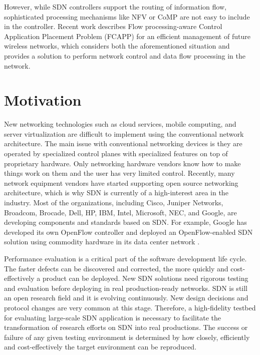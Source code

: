 However, while SDN controllers support the routing of information flow, sophisticated processing mechanisms like NFV or CoMP are not easy to include in the controller. Recent work describes Flow processing-aware Control Application Placement Problem (FCAPP) \cite {7343600} \cite{aurouxew2017} for an efficient management of future wireless networks, which considers both the aforementioned situation and provides a solution to perform network control and data flow processing in the network.

\section{Motivation}
New networking technologies such as cloud services, mobile computing, and server virtualization are difficult to implement using the conventional network architecture. The main issue with conventional networking devices is they are operated by specialized control planes with specialized features on top of proprietary hardware. Only networking hardware vendors know how to make things work on them and the user has very limited control. Recently, many network equipment vendors have started supporting open source networking architecture, which is why SDN is currently of a high-interest area in the industry. Most of the organizations, including Cisco, Juniper Networks, Broadcom, Brocade, Dell, HP, IBM, Intel, Microsoft, NEC, and Google, are developing components and standards based on SDN. For example, Google has developed its own OpenFlow controller and deployed an OpenFlow-enabled SDN solution using commodity hardware in its data center network \cite{googlesdn}.

Performance evaluation is a critical part of the software development life cycle. The faster defects can be discovered and corrected, the more quickly and cost-effectively a product can be deployed. New SDN solutions need rigorous testing and evaluation before deploying in real production-ready networks. SDN is still an open research field and it is evolving continuously. New design decisions and protocol changes are very common at this stage. Therefore, a high-fidelity testbed for evaluating large-scale SDN application is necessary to facilitate the transformation of research efforts on SDN into real productions. The success or failure of any given testing environment is determined by how closely, efficiently and cost-effectively the target environment can be reproduced.

